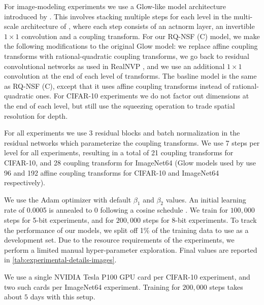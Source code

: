 For image-modeling experiments we use a Glow-like model architecture introduced by \citet[Section~3]{Kingma:2018:glow}.
This involves stacking multiple steps for each level in the multi-scale architecture of \citet{Dinh:2017:rnvp}, where each step consists of an actnorm layer, an invertible $1\times1$ convolution and a coupling transform. For our RQ-NSF (C) model,
we make the following modifications to the original Glow model: we replace affine coupling transforms with rational-quadratic coupling transforms, we go back to residual convolutional networks as used in RealNVP \cite{Dinh:2017:rnvp}, and we use an additional $1\times 1$ convolution at the end of each level of transforms. The basline model is the same as RQ-NSF (C), except that it uses affine coupling transforms instead of rational-quadratic ones.
For CIFAR-10 experiments we do not factor out dimensions at the end of each level, but still use the squeezing operation to trade spatial resolution for depth.

For all experiments we use 3 residual blocks and batch normalization \citep{ioffe:2015:batchnorm} in the residual networks which parameterize the coupling transforms. We use 7 steps per level for all experiments, resulting in a total of 21 coupling transforms for CIFAR-10, and 28 coupling transform for ImageNet64 (Glow models used by \citet{Kingma:2018:glow} use 96 and 192 affine coupling transforms for CIFAR-10 and ImageNet64 respectively).

We use the Adam \citep{kingma:2014:adam} optimizer with default $\beta_1$ and $\beta_2$ values. An initial learning rate of 0.0005 is annealed to 0 following a cosine schedule \citep{loshchilov:2016:sgdr}. We train for $100{,}000$ steps for 5-bit experiments, and for $200{,}000$ steps for 8-bit experiments.
To track the performance of our models, we split off 1\% of the training data to use as a development set. Due to the resource requirements of the experiments, we perform a limited manual hyper-parameter exploration. Final values are reported in \cref{tab:experimental-details-images}.

We use a single NVIDIA Tesla P100 GPU card per CIFAR-10 experiment, and two such cards per ImageNet64 experiment. Training for $200{,}000$ steps takes about $5$ days with this setup.

